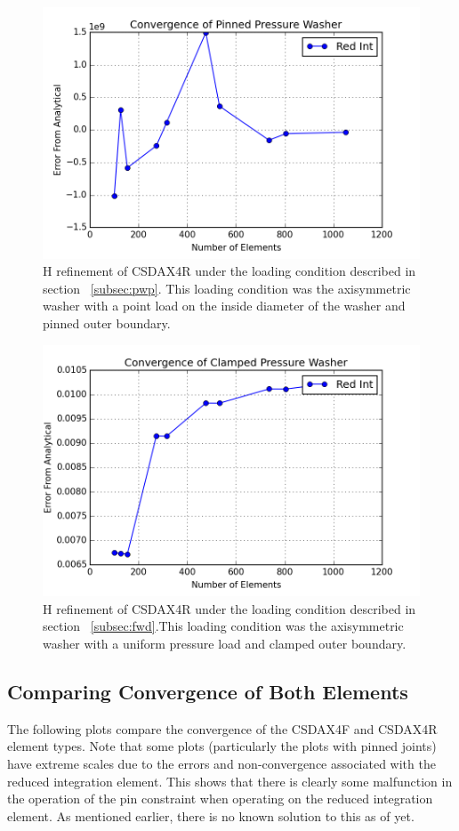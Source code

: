 \documentclass[10pt,letterpaper]{report}
\numberwithin{equation}{chapter}
\begin{document}
\begin{figure}[H]
\centering
\includegraphics[width=0.7\linewidth]{./GoodImages/Conv_WaPoPi_3}
\caption[H refinement of CSDAX4R]{H refinement of CSDAX4R under the loading condition described in section ~\ref{subsec:pwp}. This loading condition was the axisymmetric washer with a point load on the inside diameter of the washer and pinned outer boundary.}
\label{fig:Conv_PlPoCl_3}
\end{figure}

\begin{figure}[H]
\centering
\includegraphics[width=0.7\linewidth]{./GoodImages/Conv_WaPrCl_3}
\caption[H refinement of CSDAX4R]{H refinement of CSDAX4R under the loading condition described in section ~\ref{subsec:fwd}.This loading condition was the axisymmetric washer with a uniform pressure load and clamped outer boundary.}
\label{fig:Conv_PlPoCl_3}
\end{figure}

\subsection{Comparing Convergence of Both Elements}
The following plots compare the convergence of the CSDAX4F and CSDAX4R element types. Note that some plots (particularly the plots with pinned joints) have extreme scales due to the errors and non-convergence associated with the reduced integration element. This shows that there is clearly some malfunction in the operation of the pin constraint when operating on the reduced integration element. As mentioned earlier, there is no known solution to this as of yet.
\end{document}
